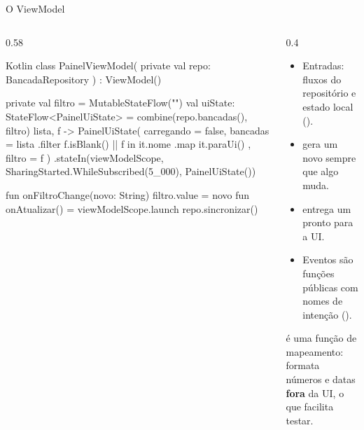 \documentclass[aspectratio=169,10pt]{beamer}
\begin{document}
\begin{frame}[fragile]{O ViewModel}
  \begin{columns}[T]
    \begin{column}{0.58\textwidth}
\begin{codigo}[title=PainelViewModel.kt]{Kotlin}
class PainelViewModel(
  private val repo: BancadaRepository
) : ViewModel() {
  private val filtro = MutableStateFlow("")
  val uiState: StateFlow<PainelUiState> =
    combine(repo.bancadas(), filtro) { lista, f ->
      PainelUiState(
        carregando = false,
        bancadas = lista
          .filter { f.isBlank() || f in it.nome }
          .map { it.paraUi() },
        filtro = f
      )
    }.stateIn(viewModelScope,
      SharingStarted.WhileSubscribed(5_000),
      PainelUiState())

  fun onFiltroChange(novo: String) { filtro.value = novo }
  fun onAtualizar() =
    viewModelScope.launch { repo.sincronizar() }
}
\end{codigo}
    \end{column}
    \begin{column}{0.4\textwidth}
      \small
      \begin{itemize}
        \item Entradas: fluxos do repositório e estado local ().
        \item {} gera um novo  sempre que algo muda.
        \item {} entrega um  pronto para a UI.
        \item Eventos são funções públicas com nomes de intenção ().
      \end{itemize}
      \begin{dica}
         é uma função de mapeamento: formata números e datas \textbf{fora} da UI, o que facilita testar.
      \end{dica}
    \end{column}
  \end{columns}
\end{frame}
\end{document}
